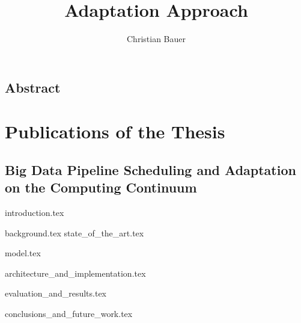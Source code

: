 \documentclass{memoir}
\title{Adaptation Approach}
\author{Christian Bauer}
\begin{document}
  \maketitle

  \tableofcontents
  \listoffigures
  

  \section*{Abstract}

  \chapter*{Publications of the Thesis}

    \section*{Big Data Pipeline Scheduling and Adaptation on the Computing Continuum}
    
    
    

  {introduction.tex}

  {background.tex}
  {state_of_the_art.tex}

  {model.tex}

  {architecture_and_implementation.tex}
  
  {evaluation_and_results.tex}

  {conclusions_and_future_work.tex}

  \cite{datacloudAbout}

  
  
\end{document}
